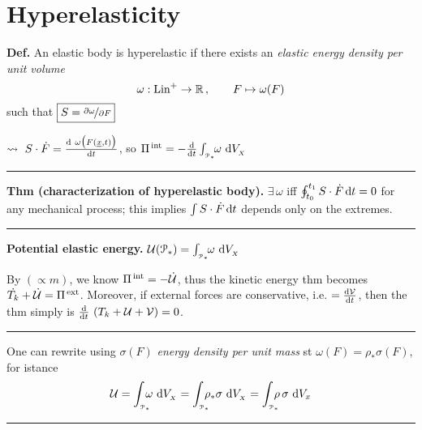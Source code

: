 
\vspace{-1em}


\section{\texorpdfstring{\color{red}Hyperelasticity}{}}


\textbf{Def.} An elastic body is hyperelastic if there exists an \emph{elastic energy density per unit volume}
\begin{equation*}
\omega:\text{Lin}^+\to\mathbb{R}\,, \qquad F\mapsto \omega(F)  
\end{equation*}
such that $\boxed{S=\nicefrac{\partial\omega}{\partial F}}$

\smallskip

$\leadsto\ S\cdot \dot{F}=\frac{\de\ \omega\big(F(\underline{x},t)\big)}{\de t}$, so $\Pi^{\,\text{int}}=-\frac{\mathrm{d} }{\mathrm{d} t}\int_{_{\EuScript{P}_*}}\!\!\omega\ \mathrm{d} V_{_X}$

\rule{0.31\textwidth}{0.2pt}
\smallskip

\textbf{Thm (characterization of hyperelastic body).} $\exists\,\omega$ iff $ \oint_{t_0}^{t_1} S\cdot\dot{F}\, \mathrm{d} t=0$
for any mechanical process; this implies $\int S\cdot\dot{F}\, \mathrm{d} t$ depends only on the extremes.

\rule{0.31\textwidth}{0.2pt}
\smallskip

\textbf{Potential elastic energy.} $\mathcal{U}(\EuScript{P}_*)=\int_{_{\EuScript{P}_*}}\!\!\omega\ \mathrm{d} V_{_X}$

\smallskip

By $(\propto\!m)$, we know $\Pi^{\,\text{int}}=-\dot{\mathcal{U}}$, thus the kinetic energy thm becomes $\dot{T_k}+\dot{\mathcal{U}}=\Pi^{\,\text{ext}}$. Moreover, if external forces are conservative, i.e. $=\frac{\mathrm{d} \mathcal{V}}{\mathrm{d} t}$, then the thm simply is $\frac{\de}{\de t}\ (T_k+\Uc+\Vc)=0$.

\rule{0.31\textwidth}{0.2pt}
\smallskip 

One can rewrite using $\sigma(F)$ \emph{energy density per unit mass} st $\omega(F)=\rho_*\sigma(F)$, for istance
\vspace{-0.5em}
\begin{equation*}
\Uc=\int_{_{\pt_*}}\!\!\!\!\omega\ \de V_{_X}=\int_{_{\pt_*}}\!\!\!\!\rho_*\sigma\ \de V_{_X}=\int_{_{\pt_*}}\!\!\!\!\rho\,\sigma\ \de V_x
\end{equation*}
\vspace{-0.5em}
\rule{0.31\textwidth}{0.2pt}

